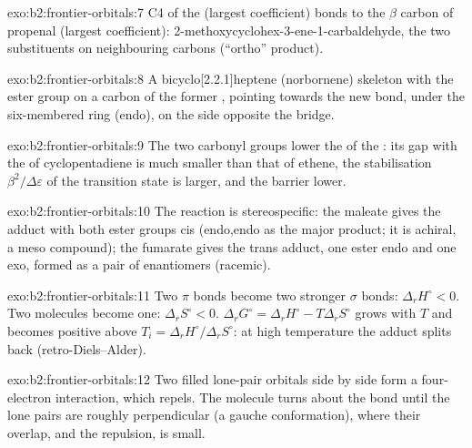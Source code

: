 \begin{solution}{exo:b2:frontier-orbitals:7}
C4 of the  (largest  coefficient) bonds to the $\beta$ carbon of propenal (largest
 coefficient): 2-methoxycyclohex-3-ene-1-carbaldehyde, the two substituents on
neighbouring carbons (``ortho'' product).
\end{solution}

\begin{solution}{exo:b2:frontier-orbitals:8}
A bicyclo[2.2.1]heptene (norbornene) skeleton with the ester group on a carbon of the
former , pointing towards the new  bond, under the six-membered ring
(endo), on the side opposite the  bridge.
\end{solution}

\begin{solution}{exo:b2:frontier-orbitals:9}
The two carbonyl groups lower the  of the : its gap with the  of
cyclopentadiene is much smaller than that of ethene, the stabilisation $\beta^2/\Delta\varepsilon$ of
the transition state is larger, and the barrier lower.
\end{solution}

\begin{solution}{exo:b2:frontier-orbitals:10}
The reaction is stereospecific: the maleate gives the adduct with both ester groups cis
(endo,endo as the major product; it is achiral, a meso compound); the fumarate gives the
trans adduct, one ester endo and one exo, formed as a pair of enantiomers (racemic).
\end{solution}

\begin{solution}{exo:b2:frontier-orbitals:11}
Two $\pi$ bonds become two stronger $\sigma$ bonds: $\Delta_r H^\circ < 0$. Two molecules become one:
$\Delta_r S^\circ < 0$. $\Delta_r G^\circ = \Delta_r H^\circ - T\Delta_r S^\circ$ grows with $T$ and becomes
positive above $T_i = \Delta_r H^\circ/\Delta_r S^\circ$: at high temperature the adduct splits back
(retro-Diels--Alder).
\end{solution}

\begin{solution}{exo:b2:frontier-orbitals:12}
Two filled lone-pair orbitals side by side form a four-electron interaction, which
repels. The molecule turns about the  bond until the lone pairs are roughly
perpendicular (a gauche conformation), where their overlap, and the repulsion, is
small.
\end{solution}

